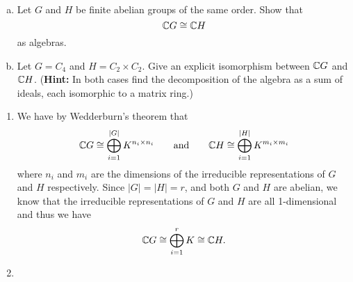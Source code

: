 \documentclass[leqno]{article}
\begin{document}
\newpage
\begin{problem}~
\begin{enumerate}[(a)]
    \item Let $G$ and $H$ be finite abelian groups of the same order. Show that
    \[
    \mathbb{C} G \cong \mathbb{C} H
    \]
    as algebras.
    \item Let $G=C_4$ and $H=C_2\times C_2$. Give an explicit isomorphism between $\mathbb{C} G$ and $\mathbb{C} H$. (\textbf{Hint:} In both cases find the decomposition of the algebra as a sum of ideals, each isomorphic to a matrix ring.)
\end{enumerate}
\end{problem}
\begin{solution}
\begin{enumerate}
    \item We have by Wedderburn's theorem that
\[
\mathbb{C} G \cong \bigoplus_{i=1}^{|G|} K^{n_i \times n_i} \qquad \textrm{and} \qquad \mathbb{C} H \cong \bigoplus_{i=1}^{|H|} K^{m_i \times m_i}
\]
where $n_i$ and $m_i$ are the dimensions of the irreducible representations of $G$ and $H$ respectively.  Since $|G|=|H|=r$, and both $G$ and $H$ are abelian, we know that the irreducible representations of $G$ and $H$ are all 1-dimensional and thus we have
\[
\mathbb{C} G \cong \bigoplus_{i=1}^{r} K \cong \mathbb{C} H.
\]
\item 
\end{enumerate}

\end{solution}
\end{document}
